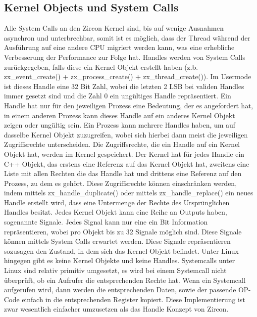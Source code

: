\documentclass[a4paper]{scrartcl}
\begin{document}
\subsection{Kernel Objects und System Calls}
Alle System Calls an den Zircon Kernel sind, bis auf wenige Ausnahmen asynchron und unterbrechbar, somit ist es möglich, dass der Thread während der Ausführung auf eine andere CPU migriert werden kann, was eine erhebliche Verbesserung der Performance zur Folge hat.
Handles werden von System Calls zurückgegeben, falls diese ein Kernel Objekt erstellt haben (z.b. zx\_event\_create() + zx\_process\_create() + zx\_thread\_create()). Im Usermode ist dieses Handle eine 32 Bit Zahl, wobei die letzten 2 LSB bei validen Handles immer gesetzt sind und die Zahl 0 ein ungültiges Handle repräsentiert. Ein Handle hat nur für den jeweiligen Prozess eine Bedeutung, der es angefordert hat, in einem anderen Prozess kann dieses Handle auf ein anderes Kernel Objekt zeigen oder ungültig sein. Ein Prozess kann mehrere Handles haben, um auf dasselbe Kernel Objekt zuzugreifen, wobei sich hierbei dann meist die jeweiligen Zugriffsrechte unterscheiden. Die Zugriffsrechte, die ein Handle auf ein Kernel Objekt hat, werden im Kernel gespeichert. Der Kernel hat für jedes Handle ein C++ Objekt, das erstens eine Referenz auf das Kernel Objekt hat, zweitens eine Liste mit allen Rechten die das Handle hat und drittens eine Referenz auf den Prozess, zu dem es gehört. Diese Zugriffsrechte können einschränken werden, indem mittels zx\_handle\_duplicate() \cite{https://fuchsia.dev/fuchsia-src/reference/syscalls/handle_replace} oder mittels zx\_handle\_replace() \cite{https://fuchsia.dev/fuchsia-src/reference/syscalls/handle_replace} ein neues Handle erstellt wird, dass eine Untermenge der Rechte des Ursprünglichen Handles besitzt.
Jedes Kernel Objekt kann eine Reihe an Outputs haben, sogenannte Signale. Jedes Signal kann nur eine ein Bit Information repräsentieren, wobei pro Objekt bis zu 32 Signale möglich sind. Diese Signale können mittels System Calls erwartet werden. Diese Signale repräsentieren sozusagen den Zustand, in dem sich das Kernel Objekt befindet.
Unter Linux hingegen gibt es keine Kernel Objekte und keine Handles. Systemcalls unter Linux sind relativ primitiv umgesetzt, es wird bei einem Systemcall nicht überprüft, ob ein Aufrufer die entsprechenden Rechte hat. Wenn ein Systemcall aufgerufen wird, dann werden die entsprechenden Daten, sowie der passende OP-Code einfach in die entsprechenden Register kopiert. Diese Implementierung ist zwar wesentlich einfacher umzusetzen als das Handle Konzept von Zircon.
\end{document}
